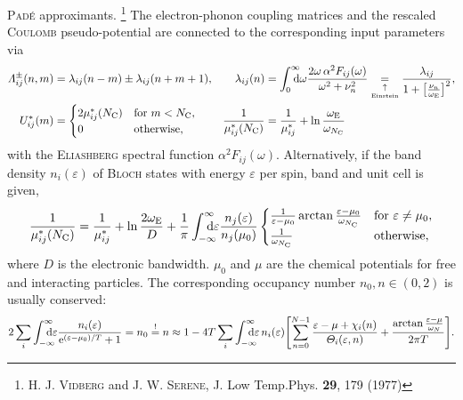 \documentclass[a4paper]{article}
\def\D{\mathrm d}
\def\E{\mathrm e}
\def\sub#1{\sb{\mathrm{#1}}}
\def\from#1{\sb{\mathrlap{#1}}}
\def\till#1{\sp{\mathrlap{#1}}}
\let\epsilon\varepsilon
\let\Lambda\varLambda
\let\Theta\varTheta
\begin{document}
   \textsc{Padé} approximants.%
   \footnote{%
      H. J. \textsc{Vidberg} and J. W. \textsc{Serene}, J. Low Temp.\@ Phys.\@
      \textbf{29}, 179 (1977)
      }
   The electron-phonon coupling matrices and the rescaled \textsc{Coulomb}
   pseudo-potential are connected to the corresponding input parameters via
   \begin{align}
      \Lambda_{i j}^\pm(n, m) &=
      \lambda_{i j}(n - m) \pm \lambda_{i j}(n + m + 1),
      &
      \lambda_{i j}(n) &=
      \int \from 0 \till \infty \D \omega
      \frac{2 \omega \, \alpha^2 F_{i j}(\omega)}{\omega^2 + \nu_n^2}
      \underset {\underset{\text{Einstein}}\uparrow} =
      \frac{\lambda_{i j}}{1 + \bigl[ \frac{\nu_n}{\omega \sub E} \bigr]^2},
      \notag
      \\
      U^*_{i j}(m) &=
      \begin{cases}
         2 \mu^*_{i j}(N \sub C) & \text{for $m < N \sub C$,} \\
         0                       & \text{otherwise,}
      \end{cases}
      &
      \frac 1 {\mu^*_{i j}(N \sub C)} &=
      \frac 1 {\mu^*_{i j}} + \ln \frac{\omega \sub E}{\omega_{N \sub C}}
      \label{cDOS rescaling}
   \end{align}
   with the \textsc{Eliashberg} spectral function $\alpha^2 F_{i j}(\omega)$.
   Alternatively, if the band density $n_i(\epsilon)$ of \textsc{Bloch} states
   with energy $\epsilon$ per spin, band and unit cell is given,
   \begin{equation}
       \frac 1 {\mu^*_{i j}(N \sub C)} =
       \frac 1 {\mu^*_{i j}} + \ln \frac {2 \omega \sub E} D +
       \frac 1 \pi \int \from{-\infty} \till \infty \D \epsilon
       \frac{n_j(\epsilon)}{n_j(\mu_0)}
       \begin{cases}
           \frac 1 {\epsilon - \mu_0}
           \arctan \frac{\epsilon - \mu_0}{\omega_{N \sub C}}
               & \text{for $\epsilon \neq \mu_0$,} \\
           \frac 1 {\omega_{N \sub C}}
               & \text{otherwise,}
       \end{cases}
      \label{rescaling}
   \end{equation}
   where $D$ is the electronic bandwidth. $\mu_0$ and $\mu$ are the chemical
   potentials for free and interacting particles. The corresponding occupancy
   number $n_0, n \in (0, 2)$ is usually conserved:
   \begin{equation*}
      2 \sum_i \int \from{-\infty} \till \infty \D \epsilon
      \frac{n_i(\epsilon)}{\E^{(\epsilon - \mu_0) / T} + 1}
      = n_0 \overset ! = n
      \approx 1 - 4 T \sum_i \int \from{-\infty} \till \infty \D \epsilon \,
      n_i(\epsilon)
      \Biggl[
         \sum_{n = 0}^{N - 1}
         \frac{\epsilon - \mu + \chi_i(n)}{\Theta_i(\epsilon, n)}
         + \frac{\arctan \frac{\epsilon - \mu}{\omega_N}}{2 \pi T}
      \Biggr].
   \end{equation*}
\end{document}
